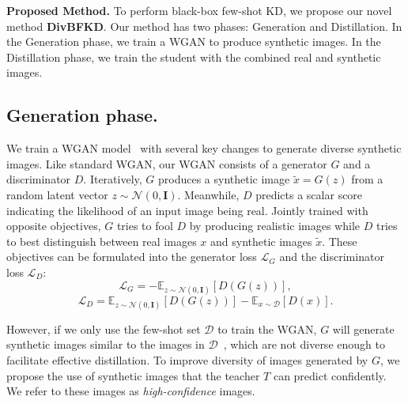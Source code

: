 \documentclass[12pt, a4paper, twoside]{book}
\numberwithin{equation}{chapter}
\theoremstyle{plain}
\theoremstyle{definition}
\theoremstyle{remark}
\newenvironment{foldable}{}{}
\begin{document}
\begin{foldable}
  \textbf{Proposed Method.}
  To perform black-box few-shot \ac{KD}, we propose our novel method \textbf{DivBFKD}.
  Our method has two phases: Generation and Distillation.
  In the Generation phase, we train a WGAN to produce synthetic images.
  In the Distillation phase, we train the student with the combined real and synthetic images.
\end{foldable}

\subsection{Generation phase.}
\begin{foldable}
  We train a WGAN model~\cite{gulrajani2017improved} with several key changes to generate diverse synthetic images.
  Like standard WGAN, our WGAN consists of a generator $G$ and a discriminator $D$.
  Iteratively, $G$ produces a synthetic image $\tilde{x} = G(z)$ from a random latent vector $z \sim \mathcal{N}(0, \mathbf{I})$.
  Meanwhile, $D$ predicts a scalar score indicating the likelihood of an input image being real.
  Jointly trained with opposite objectives, $G$ tries to fool $D$ by producing realistic images while $D$ tries to best distinguish between real images $x$ and synthetic images $\tilde{x}$.
  These objectives can be formulated into the generator loss $\mathcal{L}_G$ and the discriminator loss $\mathcal{L}_{D}$:
  \begin{equation}
    \mathcal{L}_G = -\mathbb{E}_{z \sim \mathcal{N}(0, \mathbf{I})} [D(G(z))],\label{eq:loss-G-wgan}
  \end{equation}
  \begin{equation}
    \mathcal{L}_{D} = \mathbb{E}_{z \sim \mathcal{N}(0, \mathbf{I})} [D(G(z))] - \mathbb{E}_{x \sim \mathcal{D}}[D(x)].\label{eq:loss-D-wgan}
  \end{equation}
\end{foldable}

\begin{foldable}
  However, if we only use the few-shot set $\mathcal{D}$ to train the WGAN, $G$ will generate synthetic images similar to the images in $\mathcal{D}$~\cite{karras2020training,yang2021data}, which are not diverse enough to facilitate effective distillation.
  To improve diversity of images generated by $G$, we propose the use of synthetic images that the teacher $T$ can predict confidently.
  We refer to these images as \textit{high-confidence} images.
\end{foldable}
\end{document}
